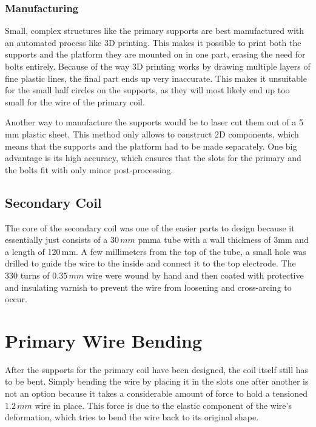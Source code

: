 \subsubsection{Manufacturing}

Small, complex structures like the primary supports are best manufactured with an automated process like 3D printing. This makes it possible to print both the supports and the platform they are mounted on in one part, erasing the need for bolts entirely. Because of the way 3D printing works by drawing multiple layers of fine plastic lines, the final part ends up very inaccurate. This makes it unsuitable for the small half circles on the supports, as they will most likely end up too small for the wire of the primary coil. 

Another way to manufacture the supports would be to laser cut them out of a 5\,mm plastic sheet. This method only allows to construct 2D components, which means that the supports and the platform had to be made separately. One big advantage is its high accuracy, which ensures that the slots for the primary and the bolts fit with only minor post-processing. 

\subsection{Secondary Coil}

The core of the secondary coil was one of the easier parts to design because it essentially just consists of a \(30\,mm\) \gls{pmma} tube with a wall thickness of 3mm and a length of 120\,mm. A few millimeters from the top of the tube, a small hole was drilled to guide the wire to the inside and connect it to the top electrode. The 330 turns of \(0.35\,mm\) wire were wound by hand and then coated with protective and insulating varnish to prevent the wire from loosening and cross-arcing to occur.

\section{Primary Wire Bending}

After the supports for the primary coil have been designed, the coil itself still has to be bent. Simply bending the wire by placing it in the slots one after another is not an option because it takes a considerable amount of force to hold a tensioned \(1.2\,mm\) wire in place. 
This force is due to the elastic component of the wire's deformation, which tries to bend the wire back to its original shape. 

